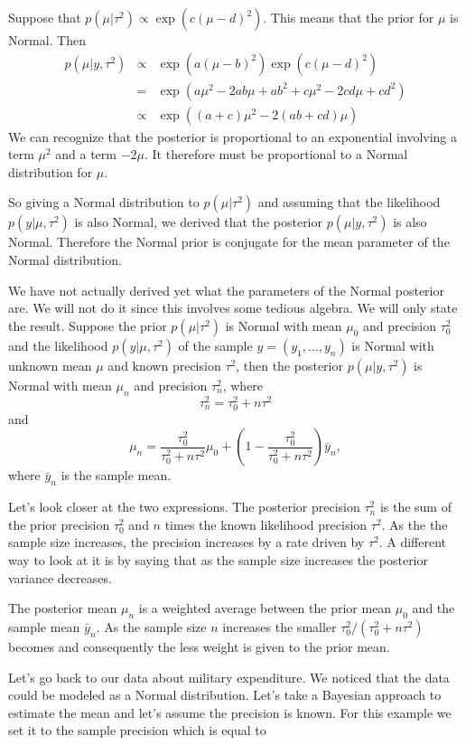 \documentclass[
]{book}
\begin{document}
Suppose that \(p(\mu|\tau^2)\propto\exp(c(\mu-d)^2)\). This means that the prior for \(\mu\) is Normal. Then
\begin{eqnarray*}
p(\mu|y,\tau^2)&\propto& \exp(a(\mu-b)^2)\exp(c(\mu-d)^2)\\
&=& \exp(a\mu^2-2ab\mu + ab^2 +c\mu^2 -2cd\mu +cd^2)\\
&\propto&\exp((a+c)\mu^2 -2(ab+cd)\mu)
\end{eqnarray*}
We can recognize that the posterior is proportional to an exponential involving a term \(\mu^2\) and a term \(-2\mu\). It therefore must be proportional to a Normal distribution for \(\mu\).

So giving a Normal distribution to \(p(\mu|\tau^2)\) and assuming that the likelihood \(p(y|\mu,\tau^2)\) is also Normal, we derived that the posterior \(p(\mu|y,\tau^2)\) is also Normal. Therefore the Normal prior is conjugate for the mean parameter of the Normal distribution.

We have not actually derived yet what the parameters of the Normal posterior are. We will not do it since this involves some tedious algebra. We will only state the result. Suppose the prior \(p(\mu|\tau^2)\) is Normal with mean \(\mu_0\) and precision \(\tau^2_0\) and the likelihood \(p(y|\mu,\tau^2)\) of the sample \(y=(y_1,\dots,y_n)\) is Normal with unknown mean \(\mu\) and known precision \(\tau^2\), then the posterior \(p(\mu|y,\tau^2)\) is Normal with mean \(\mu_n\) and precision \(\tau^2_n\), where
\[
\tau^2_n=\tau_0^2+n\tau^2
\]
and
\[
\mu_n = \frac{\tau_0^2}{\tau^2_0+n\tau^2}\mu_0 + \left(1-\frac{\tau^2_0}{\tau_0^2+n\tau^2}\right)\bar{y}_n,
\]
where \(\bar{y}_n\) is the sample mean.

Let's look closer at the two expressions. The posterior precision \(\tau^2_n\) is the sum of the prior precision \(\tau_0^2\) and \(n\) times the known likelihood precision \(\tau^2\). As the the sample size increases, the precision increases by a rate driven by \(\tau^2\). A different way to look at it is by saying that as the sample size increases the posterior variance decreases.

The posterior mean \(\mu_n\) is a weighted average between the prior mean \(\mu_0\) and the sample mean \(\bar{y}_n\). As the sample size \(n\) increases the smaller \(\tau^2_0/(\tau_0^2+n\tau^2)\) becomes and consequently the less weight is given to the prior mean.

Let's go back to our data about military expenditure. We noticed that the data could be modeled as a Normal distribution. Let's take a Bayesian approach to estimate the mean and let's assume the precision is known. For this example we set it to the sample precision which is equal to
\end{document}

